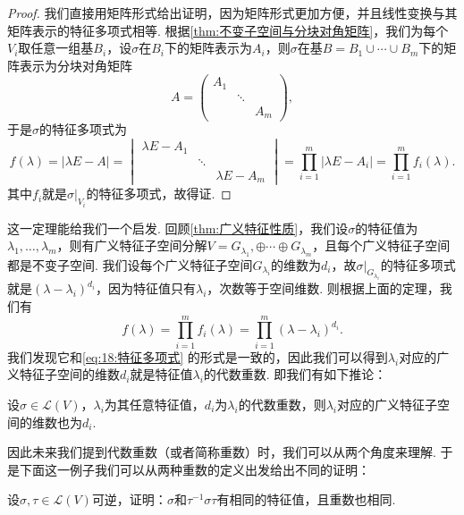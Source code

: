 \begin{proof}
    我们直接用矩阵形式给出证明，因为矩阵形式更加方便，并且线性变换与其矩阵表示的特征多项式相等. 根据\autoref{thm:不变子空间与分块对角矩阵}，我们为每个$V_i$取任意一组基$B_i$，设$\sigma$在$B_i$下的矩阵表示为$A_i$，则$\sigma$在基$B=B_1\cup\cdots\cup B_m$下的矩阵表示为分块对角矩阵
    \[A=\begin{pmatrix}
            A_1 &        &     \\
                & \ddots &     \\
                &        & A_m
        \end{pmatrix},\]
    于是$\sigma$的特征多项式为
    \[f(\lambda)=|\lambda E-A|=\begin{vmatrix}
            \lambda E-A_1 &        &               \\
                          & \ddots &               \\
                          &        & \lambda E-A_m
        \end{vmatrix}=\prod_{i=1}^m|\lambda E-A_i|=\prod_{i=1}^m f_i(\lambda).\]
    其中$f_i$就是$\sigma\vert_{V_i}$的特征多项式，故得证.
\end{proof}

这一定理能给我们一个启发. 回顾\autoref{thm:广义特征性质}，我们设$\sigma$的特征值为$\lambda_1,\ldots,\lambda_m$，则有广义特征子空间分解$V=G_{\lambda_1},\oplus\cdots\oplus G_{\lambda_m}$，且每个广义特征子空间都是不变子空间. 我们设每个广义特征子空间$G_{\lambda_i}$的维数为$d_i$，故$\sigma\vert_{G_{\lambda_i}}$的特征多项式就是$(\lambda-\lambda_i)^{d_i}$，因为特征值只有$\lambda_i$，次数等于空间维数. 则根据上面的定理，我们有
\[f(\lambda)=\prod_{i=1}^m f_i(\lambda)=\prod_{i=1}^m (\lambda-\lambda_i)^{d_i}.\]
我们发现它和\autoref{eq:18:特征多项式} 的形式是一致的，因此我们可以得到$\lambda_i$对应的广义特征子空间的维数$d_i$就是特征值$\lambda_i$的代数重数. 即我们有如下推论：
\begin{corollary}{}{}
    设$\sigma\in \mathcal{L}(V)$，$\lambda_i$为其任意特征值，$d_i$为$\lambda_i$的代数重数，则$\lambda_i$对应的广义特征子空间的维数也为$d_i$.
\end{corollary}

因此未来我们提到代数重数（或者简称重数）时，我们可以从两个角度来理解. 于是下面这一例子我们可以从两种重数的定义出发给出不同的证明：
\begin{example}{}{}
    设$\sigma,\tau\in \mathcal{L}(V)$可逆，证明：$\sigma$和$\tau^{-1}\sigma\tau$有相同的特征值，且重数也相同.
\end{example}

